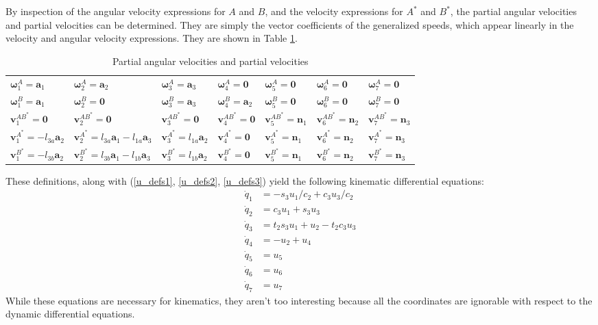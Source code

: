 \documentclass[letterpaper,11pt]{article}
\newcommand{\bs}[1]{ \boldsymbol{ #1 } }
\begin{document}
By inspection of the angular velocity expressions for $A$ and $B$, and the
velocity expressions for $A^*$ and $B^*$, the partial angular velocities and
partial velocities can be determined.  They are simply the vector coefficients
of the generalized speeds, which appear linearly in the velocity and angular
velocity expressions.  They are shown in Table \ref{partialvelocities}.

\begin{table}[!h]
  \begin{center}
    \begin{tabular}{lllllll}
      $\bs{\omega}^A_1 = \bs{a}_1$ & $\bs{\omega}^A_2 = \bs{a}_2$ &
      $\bs{\omega}^A_3 = \bs{a}_3$ & $\bs{\omega}^A_4 = \bs{0}$ &
      $\bs{\omega}^A_5 = \bs{0}$ & $\bs{\omega}^A_6 = \bs{0}$ &
      $\bs{\omega}^A_7 = \bs{0}$ \\
%
      $\bs{\omega}^B_1 = \bs{a}_1$ & $\bs{\omega}^B_2 = \bs{0}$ &
      $\bs{\omega}^B_3 = \bs{a}_3$ & $\bs{\omega}^B_4 = \bs{a}_2$ &
      $\bs{\omega}^B_5 = \bs{0}$ & $\bs{\omega}^B_6 = \bs{0}$ &
      $\bs{\omega}^B_7 = \bs{0}$ \\
%
      $\bs{v}^{AB^*}_1 = \bs{0}$ & $\bs{v}^{AB^*}_2 = \bs{0}$ &
      $\bs{v}^{AB^*}_3 = \bs{0}$ & $\bs{v}^{AB^*}_4 = \bs{0}$ &
      $\bs{v}^{AB^*}_5 = \bs{n}_1$ & $\bs{v}^{AB^*}_6 = \bs{n}_2$ &
      $\bs{v}^{AB^*}_7 = \bs{n}_3$ \\
%
      $\bs{v}^{A^*}_1 = -l_{3a}\bs{a}_2$ &
      $\bs{v}^{A^*}_2 = l_{3a}\bs{a}_1 - l_{1a}\bs{a}_3$ &
      $\bs{v}^{A^*}_3 = l_{1a} \bs{a}_2$ &
      $\bs{v}^{A^*}_4 = \bs{0}$ & $\bs{v}^{A^*}_5 = \bs{n}_1$ & 
      $\bs{v}^{A^*}_6 = \bs{n}_2$ & $\bs{v}^{A^*}_7 = \bs{n}_3$ \\
%
      $\bs{v}^{B^*}_1 = -l_{3b}\bs{a}_2$ &
      $\bs{v}^{B^*}_2 = l_{3b}\bs{a}_1 - l_{1b}\bs{a}_3$ &
      $\bs{v}^{B^*}_3 = l_{1b} \bs{a}_2$ & $\bs{v}^{B^*}_4 = \bs{0}$ &
      $\bs{v}^{B^*}_5 = \bs{n}_1$ & $\bs{v}^{B^*}_6 = \bs{n}_2$ &
      $\bs{v}^{B^*}_7 = \bs{n}_3$
%
    \end{tabular}
  \end{center}
  \caption{Partial angular velocities and partial velocities}
  \label{partialvelocities}
\end{table}

These definitions, along with (\ref{u_defs1}, \ref{u_defs2}, \ref{u_defs3})
yield the following kinematic differential equations:
\begin{align*}
  \dot{q}_1 &=  -s_3u_1/c_2 + c_3u_3/c_2\\
  \dot{q}_2 &=  c_3u_1 + s_3u_3 \\
  \dot{q}_3 &=  t_2s_3u_1 + u_2 - t_2c_3u_3 \\
  \dot{q}_4 &= -u_2 +  u_4 \\
  \dot{q}_5 &= u_5 \\
  \dot{q}_6 &= u_6 \\
  \dot{q}_7 &= u_7
\end{align*}
While these equations are necessary for kinematics, they aren't too interesting
because all the coordinates are ignorable with respect to the dynamic
differential equations.
\end{document}
